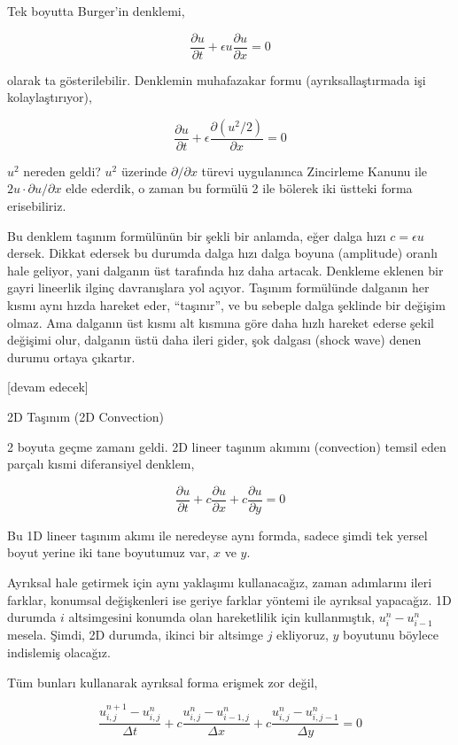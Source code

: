 \documentclass[12pt,fleqn]{article}\usepackage{../../common}
\begin{document}
Tek boyutta Burger'in denklemi,

$$
\frac{\partial u}{\partial t} + \epsilon u \frac{\partial u}{\partial x} = 0
$$

olarak ta gösterilebilir. Denklemin muhafazakar formu (ayrıksallaştırmada işi
kolaylaştırıyor),

$$
\frac{\partial u}{\partial t} + \epsilon \frac{\partial (u^2 / 2)}{\partial x} = 0
$$

$u^2$ nereden geldi? $u^2$ üzerinde $\partial / \partial x$ türevi uygulanınca
Zincirleme Kanunu ile $2 u \cdot \partial u / \partial x$ elde ederdik, o zaman
bu formülü 2 ile bölerek iki üstteki forma erisebiliriz.

Bu denklem taşınım formülünün bir şekli bir anlamda, eğer dalga hızı
$c = \epsilon u$ dersek. Dikkat edersek bu durumda dalga hızı dalga boyuna
(amplitude) oranlı hale geliyor, yani dalganın üst tarafında hız daha artacak.
Denkleme eklenen bir gayri lineerlik ilginç davranışlara yol açıyor. Taşınım
formülünde dalganın her kısmı aynı hızda hareket eder, ``taşınır'', ve bu
sebeple dalga şeklinde bir değişim olmaz. Ama dalganın üst kısmı alt kısmına
göre daha hızlı hareket ederse şekil değişimi olur, dalganın üstü daha ileri
gider, şok dalgası (shock wave) denen durumu ortaya çıkartır. 

[devam edecek]

2D Taşınım (2D Convection)

2 boyuta geçme zamanı geldi. 2D lineer taşınım akımını (convection) temsil eden
parçalı kısmi diferansiyel denklem,

$$
\frac{\partial u}{\partial t} +
c\frac{\partial u}{\partial x} +
c\frac{\partial  u}{\partial y} = 0
$$

Bu 1D lineer taşınım akımı ile neredeyse aynı formda, sadece şimdi tek yersel
boyut yerine iki tane boyutumuz var, $x$ ve $y$.

Ayrıksal hale getirmek için aynı yaklaşımı kullanacağız, zaman adımlarını ileri
farklar, konumsal değişkenleri ise geriye farklar yöntemi ile ayrıksal
yapacağız. 1D durumda $i$ altsimgesini konumda olan hareketlilik için
kullanmıştık,  $u_{i}^n-u_{i-1}^n$ mesela. Şimdi, 2D durumda, ikinci bir
altsimge $j$ ekliyoruz, $y$ boyutunu böylece indislemiş olacağız.

Tüm bunları kullanarak ayrıksal forma erişmek zor değil,

$$
\frac{u_{i,j}^{n+1}-u_{i,j}^n}{\Delta t} +
c\frac{u_{i, j}^n-u_{i-1,j}^n}{\Delta x} +
c\frac{u_{i,j}^n-u_{i,j-1}^n}{\Delta y}=0
$$
\end{document}

